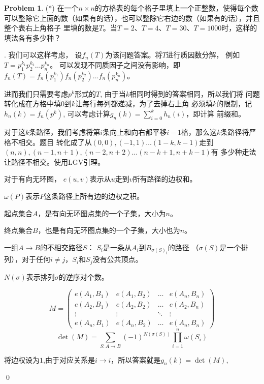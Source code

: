 \documentclass[UTF8]{ctexart}
\newenvironment{sol}
  {\par\vspace{3mm}\noindent{\it Solution}.}
  {\qed \\ \medskip}
\theoremstyle{definition}
\newtheorem{problem}{Problem}
\begin{document}
\begin{problem} (*)
在一个$n \times n$的方格表的每个格子里填上一个正整数，使得每个数可以整除它上面的数（如果有的话），也可以整除它右边的数（如果有的话），并且整个表右上角格子
里填的数是$T$。当$T=2$、$T=4$、$T=30$、$T = 1000$时，这样的填法各有多少种？

\begin{sol}
    我们可以这样考虑，
    设$f_n(T)$为该问题答案。将$T$进行质因数分解，
    例如$T=p_1^{k_1}p_2^{k_2}\dots p_n^{k_n}$。 
    可以发现不同质因子之间没有影响，即$f_n(T)=f_n(p_1^{k_1})f_n(p_2^{k_2})\dots f_n(p_n^{k_n})$。

    进而我们只需要考虑$p^k$形式的$T$, 由于当$k$相同时得到的答案相同，所以我们将
    问题转化成在方格中填$0$到$k$让每行每列都递减，为了去掉右上角
    必须填$k$的限制，记$h_n(k)=f_n(p^k)$, 可以考虑计算$g_n(k)=\sum_{i=0}^kh_n(i)$，即计算
    前缀和。

    对于这$k$条路径，我们考虑将第$i$条向上和向右都平移$i-1$格，那么这$k$条路径将严格不相交。题目
    转化成了从$(0,0),(-1,1)\dots(1-k,k-1)$走到$(n,n),(n-1,n+1),(n-2,n+2)\dots(n-k+1,n+k-1)$有
    多少种走法让路径不相交。使用LGV引理。

    \begin{lemma}
        对于有向无环图，
        $e(u, v)$表示从$u$走到$v$所有路径的边权和。

        $\omega(P)$表示$P$这条路径上所有边的边权之积。

        起点集合$A$，是有向无环图点集的一个子集，大小为$n$。

        终点集合$B$，也是有向无环图点集的一个子集，大小也为$n$。

        一组$A \rightarrow B$的不相交路径$S$： $S_i$是一条从$A_i$到$B_{\sigma(S)_i}$的路径
        （$\sigma(S)$是一个排列），对于任何$i \not= j$，$S_i$和$S_j$没有公共顶点。

        $N(\sigma)$表示排列$\sigma$的逆序对个数。

        $$
        M = 
        \begin{pmatrix}
            e(A_1,B_1) & e(A_1,B_2) & \dots & e(A_n,B_n)\\
            e(A_2,B_1) & e(A_2,B_2) & \dots & e(A_2,B_n)\\
            \vdots & \vdots & \ddots & \vdots \\
            e(A_n,B_1) & e(A_n,B_2) & \dots & e(A_n,B_n)
        \end{pmatrix}
        $$
        $$\det(M)=\sum_{S:A\rightarrow B}(-1)^{N(\sigma(S))}\prod_{i=1}^n \omega(S_i)$$
    \end{lemma}
    将边权设为$1$,由于对应关系是$i \rightarrow i$，所以答案就是$g_n(k)=\det(M)$,


\end{sol}
\end{problem}
\end{document}
